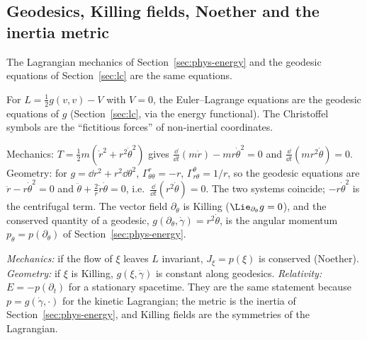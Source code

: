 \subsection{Geodesics, Killing fields, Noether and the inertia metric}\label{sec:noethersynth}

The Lagrangian mechanics of Section~\ref{sec:phys-energy} and the geodesic equations of Section~\ref{sec:lc} are the same equations.

\begin{synthesis}[free motion $=$ geodesic of the inertia metric]
For $L=\frac12g(v,v)-V$ with $V=0$, the Euler--Lagrange equations are the geodesic equations of $g$ (Section~\ref{sec:lc}, via the energy functional). The Christoffel symbols are the ``fictitious forces'' of non-inertial coordinates.
\end{synthesis}

\begin{example}\label{ex:polarfree}
Mechanics: $T=\frac12m(\dot r^2+r^2\dot\theta^2)$ gives $\frac{\dd}{\dd t}(m\dot r)-mr\dot\theta^2=0$ and $\frac{\dd}{\dd t}(mr^2\dot\theta)=0$.
Geometry: for $g=\dd r^2+r^2\dd\theta^2$, $\Gamma^r_{\theta\theta}=-r$, $\Gamma^\theta_{r\theta}=1/r$, so the geodesic equations are $\ddot r-r\dot\theta^2=0$ and $\ddot\theta+\frac2r\dot r\dot\theta=0$, i.e.\ $\frac{\dd}{\dd t}(r^2\dot\theta)=0$.
The two systems coincide; $-r\dot\theta^2$ is the centrifugal term. The vector field $\partial_\theta$ is Killing ($\Lie_{\partial_\theta}g=0$), and the conserved quantity of a geodesic, $g(\partial_\theta,\dot\gamma)=r^2\dot\theta$, is the angular momentum $p_\theta=p(\partial_\theta)$ of Section~\ref{sec:phys-energy}.
\end{example}

\begin{keyidea}
\emph{Mechanics:} if the flow of $\xi$ leaves $L$ invariant, $J_\xi=p(\xi)$ is conserved (Noether). \emph{Geometry:} if $\xi$ is Killing, $g(\xi,\dot\gamma)$ is constant along geodesics. \emph{Relativity:} $E=-p(\partial_t)$ for a stationary spacetime.
They are the same statement because $p=g(\dot\gamma,\cdot)$ for the kinetic Lagrangian; the metric is the inertia of Section~\ref{sec:phys-energy}, and Killing fields are the symmetries of the Lagrangian.
\end{keyidea}

